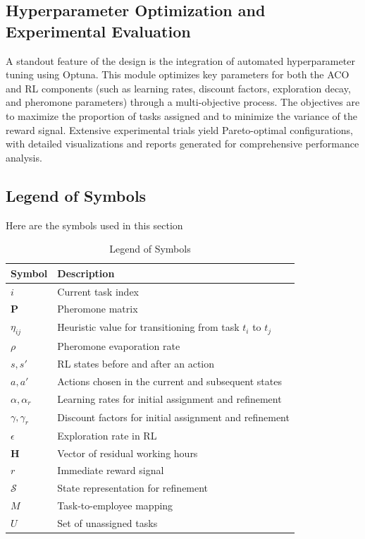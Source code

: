 \documentclass[%
aip,
cp,  %
amsmath,amssymb,
reprint,%
]{revtex4-2}
\begin{document}
	\subsection{\label{subsec:hyperparameter}Hyperparameter Optimization and Experimental Evaluation}
	
	A standout feature of the design is the integration of automated hyperparameter tuning using Optuna. This module optimizes key parameters for both the ACO and RL components (such as learning rates, discount factors, exploration decay, and pheromone parameters) through a multi-objective process. The objectives are to maximize the proportion of tasks assigned and to minimize the variance of the reward signal. Extensive experimental trials yield Pareto-optimal configurations, with detailed visualizations and reports generated for comprehensive performance analysis.
	
	\subsection{\label{subsec:legend}Legend of Symbols}
	
	Here are the symbols used in this section
	
	\begin{table}
		\caption{\label{tab:legend}Legend of Symbols}
		\begin{ruledtabular}
			\begin{tabular}{ll}
				\textbf{Symbol} & \textbf{Description} \\
				\hline
				$i$ & Current task index \\
				$\mathbf{P}$ & Pheromone matrix \\
				$\eta_{ij}$ & Heuristic value for transitioning from task $t_i$ to $t_j$ \\
				$\rho$ & Pheromone evaporation rate \\
				$s, s'$ & RL states before and after an action \\
				$a, a'$ & Actions chosen in the current and subsequent states \\
				$\alpha, \alpha_r$ & Learning rates for initial assignment and refinement \\
				$\gamma, \gamma_r$ & Discount factors for initial assignment and refinement \\
				$\epsilon$ & Exploration rate in RL \\
				$\mathbf{H}$ & Vector of residual working hours \\
				$r$ & Immediate reward signal \\
				$\mathcal{S}$ & State representation for refinement \\
				$M$ & Task-to-employee mapping \\
				$U$ & Set of unassigned tasks \\
			\end{tabular}
		\end{ruledtabular}
	\end{table}
	
\end{document}
